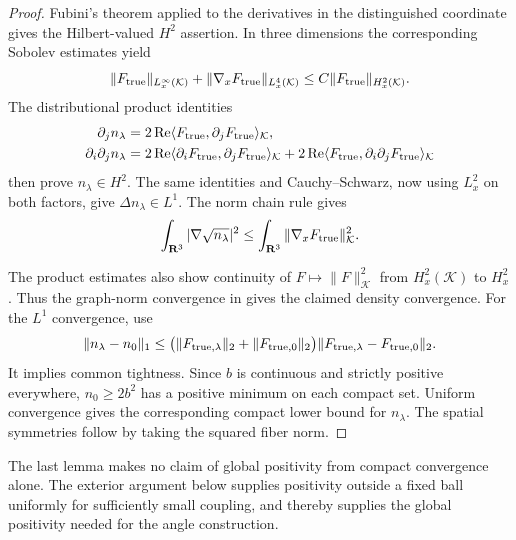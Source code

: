 \begin{proof}
Fubini's theorem applied to the derivatives in the distinguished
coordinate gives the Hilbert-valued \(H^2\) assertion.  In three
dimensions the corresponding Sobolev estimates yield
\[
 \|F_{\rm true}\|_{L^\infty_x(\mathcal K)}
 +\|\nabla_xF_{\rm true}\|_{L^4_x(\mathcal K)}
 \le C\|F_{\rm true}\|_{H^2_x(\mathcal K)} .
\]
The distributional product identities
\begin{align}
 \partial_j n_\lambda
 &=2\operatorname{Re}
      \langle F_{\rm true},\partial_jF_{\rm true}\rangle_{\mathcal K},
 \notag\\
 \partial_i\partial_j n_\lambda
 &=2\operatorname{Re}
      \langle\partial_iF_{\rm true},\partial_jF_{\rm true}\rangle_{\mathcal K}
   +2\operatorname{Re}
      \langle F_{\rm true},\partial_i\partial_jF_{\rm true}\rangle_{\mathcal K}
 \label{eq:density-product-identities}
\end{align}
then prove \(n_\lambda\in H^2\).  The same identities and
Cauchy--Schwarz, now using \(L^2_x\) on both factors, give
\(\Delta n_\lambda\in L^1\).  The norm chain rule gives
\begin{equation}
 \int_{\mathbf R^3}|\nabla\sqrt{n_\lambda}|^2
 \le \int_{\mathbf R^3}\|\nabla_xF_{\rm true}\|_{\mathcal K}^2 .
 \label{eq:density-kinetic-bound}
\end{equation}

The product estimates also show continuity of
\(F\mapsto\|F\|_{\mathcal K}^2\) from \(H^2_x(\mathcal K)\) to
\(H^2_x\).  Thus the graph-norm convergence in
 gives the claimed density convergence.
For the \(L^1\) convergence, use
\[
 \|n_\lambda-n_0\|_1
 \le
 \bigl(\|F_{{\rm true},\lambda}\|_2+\|F_{{\rm true},0}\|_2\bigr)
 \|F_{{\rm true},\lambda}-F_{{\rm true},0}\|_2 .
\]
It implies common tightness.  Since \(b\) is continuous and
strictly positive everywhere, \(n_0\ge2b^2\) has a positive minimum
on each compact set.  Uniform convergence gives the corresponding
compact lower bound for \(n_\lambda\).  The spatial symmetries
follow by taking the squared fiber norm.
\end{proof}

The last lemma makes no claim of global positivity from compact
convergence alone.  The exterior argument below supplies positivity
outside a fixed ball uniformly for sufficiently small coupling, and
thereby supplies the global positivity needed for the angle
construction.

